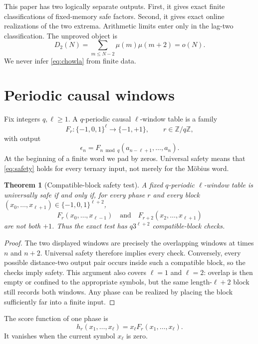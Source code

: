 \documentclass[11pt]{article}
\newtheorem{theorem}{Theorem}[section]
\theoremstyle{definition}
\theoremstyle{remark}
\newcommand{\mob}{\mu}
\newcommand{\TT}{\{-1,0,1\}}
\newcommand{\SSS}{\{-1,+1\}}
\begin{document}
This paper has two logically separate outputs.  First, it gives exact finite
classifications of fixed-memory safe factors.  Second, it gives exact online
realizations of the two extrema.  Arithmetic limits enter only in the lag-two
classification.  The unproved object is
\begin{equation}
                   D_2(N)=\sum_{m\le N-2}\mob(m)\mob(m+2)=o(N).
                   \label{eq:chowla}
\end{equation}
We never infer \eqref{eq:chowla} from finite data.

\section{Periodic causal windows}

Fix integers $q,\ell\ge1$.  A $q$-periodic causal $\ell$-window table is a
family
\[
 F_r:\TT^\ell\longrightarrow\SSS,\qquad r\in\mathbb Z/q\mathbb Z,
\]
with output
\[
 \epsilon_n=F_{n\bmod q}(a_{n-\ell+1},\ldots,a_n).
\]
At the beginning of a finite word we pad by zeros.  Universal safety means
that \eqref{eq:safety} holds for every ternary input, not merely for the
M\"obius word.

\begin{theorem}[Compatible-block safety test]
\label{thm:block-test}
A fixed $q$-periodic $\ell$-window table is universally safe if and only if,
for every phase $r$ and every block
$(x_0,\ldots,x_{\ell+1})\in\TT^{\ell+2}$,
\begin{equation}
 F_r(x_0,\ldots,x_{\ell-1})\quad\text{and}\quad
 F_{r+2}(x_2,\ldots,x_{\ell+1})
 \label{eq:block-check}
\end{equation}
are not both $+1$.  Thus the exact test has
$q3^{\ell+2}$ compatible-block checks.
\end{theorem}

\begin{proof}
The two displayed windows are precisely the overlapping windows at times
$n$ and $n+2$.  Universal safety therefore implies every check.  Conversely,
every possible distance-two output pair occurs inside such a compatible
block, so the checks imply safety.  This argument also covers $\ell=1$ and
$\ell=2$: overlap is then empty or confined to the appropriate symbols, but
the same length-$\ell+2$ block still records both windows.  Any phase can be
realized by placing the block sufficiently far into a finite input.
\end{proof}

The score function of one phase is
\[
 h_r(x_1,\ldots,x_\ell)=x_\ell F_r(x_1,\ldots,x_\ell).
\]
It vanishes when the current symbol $x_\ell$ is zero.
\end{document}
